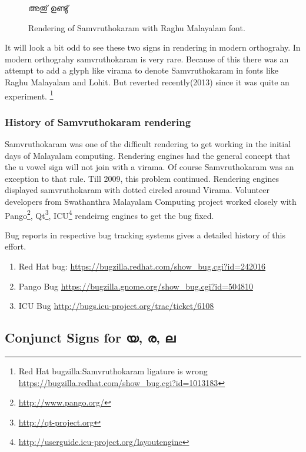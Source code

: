 \begin{figure}[h!]
  \centering
  {\raghumalayalam\textexample  അതു് ഉണ്ടു് }\\
  \caption{Rendering of Samvruthokaram with Raghu Malayalam font.}
  \label{SamvruthokaramModern}
\end{figure}

It will look a bit odd to see these two signs in rendering in modern 
orthograhy. In modern orthograhy samvruthokaram is very rare. 
Because of this there was an attempt to add a glyph like virama to denote 
Samvruthokaram in fonts like Raghu Malayalam and Lohit.
But reverted recently(2013) since it was quite an experiment.
\footnote{Red Hat bugzilla:Samvruthokaram ligature is wrong 
\url{https://bugzilla.redhat.com/show_bug.cgi?id=1013183}}

\subsubsection{History of Samvruthokaram rendering}

Samvruthokaram was one of the difficult rendering to get working in the initial 
days of Malayalam computing.
Rendering engines had the general concept that the u vowel sign will not join 
with a virama. Of course Samvruthokaram was an exception to that rule.
Till 2009, this problem continued. Rendering engines displayed samvruthokaram 
with dotted circled around Virama. 
Volunteer developers from Swathanthra Malayalam Computing project worked 
closely with Pango\footnote{\url{http://www.pango.org/}}, 
Qt\footnote{\url{http://qt-project.org}}, 
ICU\footnote{\url{http://userguide.icu-project.org/layoutengine}} rendeirng 
engines to get the bug fixed.

Bug reports in respective bug tracking systems gives a detailed history of this 
effort.

\begin{enumerate}
  \item Red Hat bug: \url{https://bugzilla.redhat.com/show_bug.cgi?id=242016}
  \item Pango Bug \url{https://bugzilla.gnome.org/show_bug.cgi?id=504810}
  \item ICU Bug \url{http://bugs.icu-project.org/trac/ticket/6108}
\end{enumerate}

\subsection {Conjunct Signs for യ, ര, ല}

